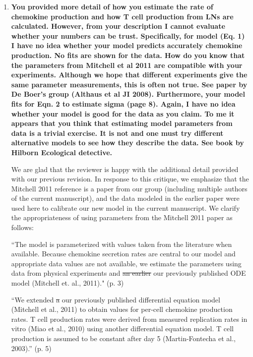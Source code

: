 \documentclass[10pt]{article}
\newcommand{\removed}[1]{{\color{dkred}\sout{#1}}}
\newcommand{\new}[1]{{\color{dkgreen}#1}}
\newenvironment{response}{\fontfamily{cms}\selectfont\small}{\par}
\begin{document}
\begin{enumerate}

\item \textbf{You provided more detail of how you estimate the rate of chemokine production and how T cell production from LNs are calculated. However, from your description I cannot evaluate whether your numbers can be trust. Specifically, for model (Eq. 1) I have no idea whether your model predicts accurately chemokine production. No fits are shown for the data. How do you know that the parameters from Mitchell et al 2011 are compatible with your experiments. Although we hope that different experiments give the same parameter measurements, this is often not true. See paper by De Boer's group (Althaus et al JI 2008). Furthermore, your model fits for Eqn. 2 to estimate sigma (page 8). Again, I have no idea whether your model is good for the data as you claim. To me it appears that you think that estimating model parameters from data is a trivial exercise. It is not and one must try different alternative models to see how they describe the data. See book by Hilborn Ecological detective.}

\begin{response}

We are glad that the reviewer is happy with the additional detail provided with our previous revision. In response to this critique, we emphasize that the Mitchell 2011 reference is a paper from our group (including multiple authors of the current manuscript), and the data modeled in the earlier paper were used here to calibrate our new model in the current manuscript. We clarify the appropriateness of using parameters from the Mitchell 2011 paper as follows: 

\begin{displayquote}
``The model is parameterized with values taken from the literature when available. Because chemokine secretion rates are central to our model and appropriate data values are not available, we estimate the parameters using data from physical experiments and \removed{an earlier} \new{our previously published} ODE model (Mitchell et. al., 2011)." (p. 3)
\end{displayquote}

\begin{displayquote}
``We extended \removed{a} \new{our}  previously published differential equation model (Mitchell et al., 2011) to obtain values for per-cell chemokine production rates. T cell production rates were derived from measured replication rates in vitro (Miao et al., 2010) using another differential equation model. T cell production is assumed to be constant after day 5 (Martin-Fontecha et al., 2003).'' (p. 5) 
\end{displayquote}


\end{response}
\end{enumerate}
\end{document}
